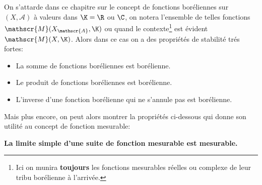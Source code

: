 \chapter*{} %
On s'attarde dans ce chapitre sur le concept de fonctions boréliennes sur \((X, \mathscr{A})\) à valeurs dans \(\K = \R\) ou \(\C\), on notera l'ensemble de telles fonctions \(\mathscr{M}(X_\mathscr{A}, \K)\) ou quand le contexte\footnote[1]{Ici on munira \textbf{toujours} les fonctions mesurables réelles ou complexe de leur tribu borélienne à l'arrivée.} est évident \(\mathscr{M}(X, \K)\). Alors dans ce cas on a des propriétés de stabilité trés fortes:
\begin{itemize}
   \item La somme de fonctions boréliennes est borélienne.
   \item Le produit de fonctions boréliennes est borélienne.
   \item L'inverse d'une fonction borélienne qui ne s'annule pas est borélienne.
\end{itemize}
Mais plus encore, on peut alors montrer la propriétés ci-dessous qui donne son utilité au concept de fonction mesurable:
\begin{center}
   \textbf{La limite simple d'une suite de fonction mesurable est mesurable.}
\end{center}
